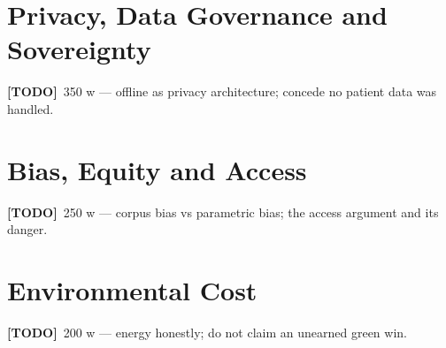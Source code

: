 \documentclass[11pt,a4paper]{report}
\newcommand{\todo}[1]{\par\noindent\textcolor{red!70!black}{\small\textbf{[TODO]}~#1}\par}
\begin{document}
\section{Privacy, Data Governance and Sovereignty}
\label{sec:lsep-privacy}
\todo{350 w — offline as privacy architecture; concede no patient data was handled.}

\section{Bias, Equity and Access}
\label{sec:lsep-bias}
\todo{250 w — corpus bias vs parametric bias; the access argument and its danger.}

\section{Environmental Cost}
\label{sec:lsep-energy}
\todo{200 w — energy honestly; do not claim an unearned green win.}
\end{document}
